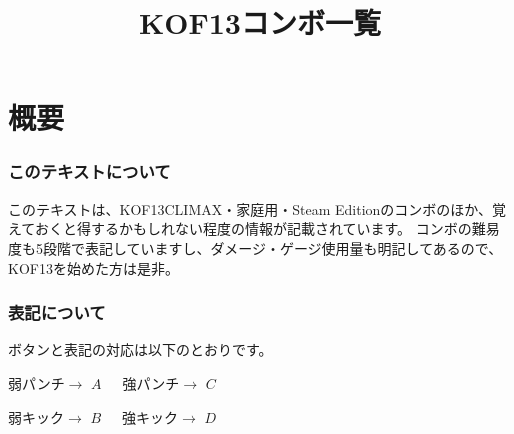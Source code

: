 \documentclass[a4j,11pt]{jarticle}
\title{KOF13コンボ一覧}
\author{}
\begin{document}
\maketitle
\tableofcontents %
\newpage
\part{概要}
\section{このテキストについて}
このテキストは、KOF13CLIMAX・家庭用・Steam Editionのコンボのほか、覚えておくと得するかもしれない程度の情報が記載されています。
コンボの難易度も5段階で表記していますし、ダメージ・ゲージ使用量も明記してあるので、KOF13を始めた方は是非。
\section{表記について}
ボタンと表記の対応は以下のとおりです。

\begin{screen}

 弱パンチ$\rightarrow$ $A$\ \ \ 強パンチ$\rightarrow$ $C$
 
 弱キック$\rightarrow$ $B$\ \ \ 強キック$\rightarrow$ $D$
\end{screen}
\vspace{11pt}
\end{document}
